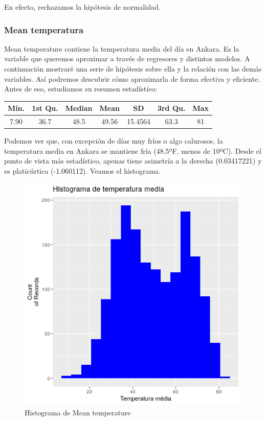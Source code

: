En efecto, rechazamos la hipótesis de normalidad.

\subsubsection{Mean temperatura}

Mean temperature contiene la temperatura media del día en Ankara. Es la variable que queremos aproximar a través de regresores y distintos modelos. A continuación mostraré una serie de hipótesis sobre ella y la relación con las demás variables. Así podremos descubrir cómo aproximarla de forma efectiva y eficiente. Antes de eso, estudiamos su resumen estadístico:

\begin{table}[H]
	\centering
	\begin{tabular}{|c|c|c|c|c|c|c|}
		\hline
		Mín. & 1st Qu. & Median & Mean  & SD      & 3rd Qu. & Max \\ \hline
		7.90 & 36.7    & 48.5   & 49.56 & 15.4564 & 63.3    & 81  \\ \hline
	\end{tabular}
\end{table}

Podemos ver que, con excepción de días muy fríos o algo calurosos, la temperatura media en Ankara se mantiene fría (48.5ºF, menos de 10ºC). Desde el punto de vista más estadístico, apenas tiene asimetría a la derecha (0.03417221) y es platicúrtica (-1.060112). Veamos el histograma.


\begin{figure}[H] %
	\centering
	\includegraphics[scale=0.7]{hist-mt.png}  %
	\caption{Histograma de Mean temperature} 
	\label{fig:hist-mt}
\end{figure}


